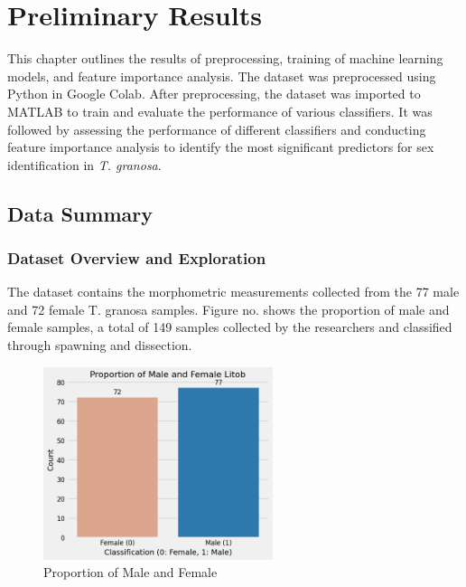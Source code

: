 
\chapter{Preliminary Results}
This chapter outlines the results of preprocessing, training of machine learning models, and feature importance analysis. The dataset was preprocessed using Python in Google Colab. After preprocessing, the dataset was imported to MATLAB to train and evaluate the performance of various classifiers. It was followed by assessing the performance of different classifiers and conducting feature importance analysis to identify the most significant predictors for sex identification in \textit{T. granosa}.

\section{Data Summary}
\subsection{Dataset Overview and Exploration}

The dataset contains the morphometric measurements collected from the 77 male and 72 female T. granosa samples. Figure no. shows the proportion of male and female samples, a total of 149 samples collected by the researchers and classified through spawning and dissection. 

\begin{figure}[!htbp]
	\centering
	\includegraphics[width=0.6\textwidth]{figures/test-train.png}
	\caption{Proportion of Male and Female \Tgranosa}
	\label{fig:test-train}
\end{figure}

